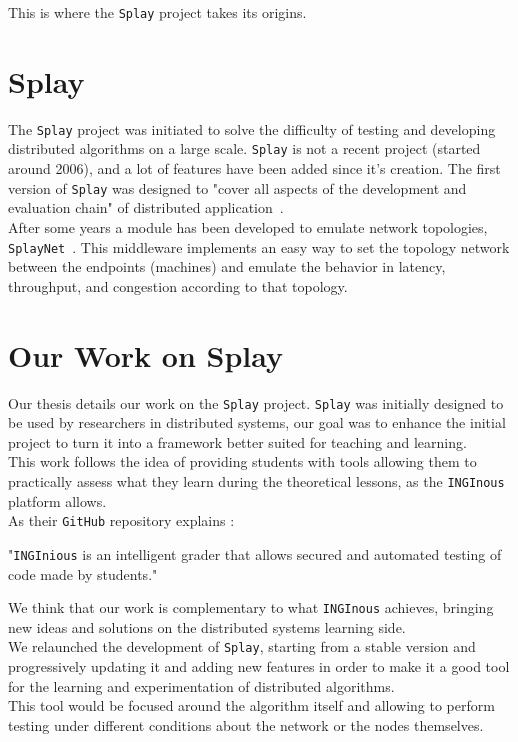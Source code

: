 \documentclass{eplmastersthesis}
\begin{document}
      This is where the \texttt{Splay} project takes its origins.

    \section{Splay}

      The \texttt{Splay} project was initiated to solve the difficulty of testing
      and developing distributed algorithms on a large scale. \texttt{Splay} is
      not a recent project (started around 2006), and a lot of features have been
      added since it's creation. The first version of \texttt{Splay} was
      designed to "cover all aspects of the development and evaluation
      chain" of distributed application~\cite{SPLAY}.\\
      After some years a module has been developed to emulate network
      topologies, \texttt{SplayNet}~\cite{SplayNet}. This middleware implements
      an easy way to set the topology network between the endpoints (machines)
      and emulate the behavior in latency, throughput, and congestion according
      to that topology.

    \section{Our Work on Splay}

      Our thesis details our work on the \texttt{Splay} project. \texttt{Splay}
      was initially designed to be used by researchers in distributed systems,
      our goal was to enhance the initial project to turn it into a framework
      better suited for teaching and learning.\\
      This work follows the idea of providing students with tools
      allowing them to practically assess what they learn during the
      theoretical lessons, as the \texttt{INGInous}~\cite{inginious} platform allows.\\
      As their \texttt{GitHub} repository explains :
      \begin{displayquote}
        "\texttt{INGInious} is an intelligent grader that allows secured and
        automated testing of code made by students."
      \end{displayquote}
      We think that our work is complementary to what \texttt{INGInous} achieves,
      bringing new ideas and solutions on the distributed systems learning
      side.\\

      We relaunched the development of \texttt{Splay}, starting from a stable
      version and progressively updating it and adding new
      features in order to make it a good tool for the learning and
      experimentation of distributed algorithms.\\
      This tool would be focused around the algorithm itself and allowing to
      perform testing under different conditions about the network or
      the nodes themselves.\\
\end{document}
